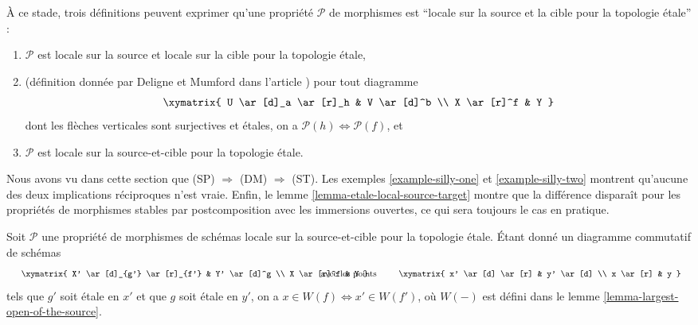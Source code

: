 \begin{remark}
\label{remark-compare-definitions}
À ce stade, trois définitions peuvent exprimer qu'une propriété
$\mathcal{P}$ de morphismes est ``locale sur la source et la cible pour la
topologie \'etale'' :
\begin{enumerate}
\item[(ST)] $\mathcal{P}$ est locale sur la source et locale sur la cible pour
la topologie \'etale,
\item[(DM)] (définition donnée par Deligne et Mumford dans l'article
\cite[p.~100]{DM}) pour tout diagramme
$$
\xymatrix{
U \ar[d]_a \ar[r]_h & V \ar[d]^b \\
X \ar[r]^f & Y
}
$$
dont les flèches verticales sont surjectives et étales, on a
$\mathcal{P}(h) \Leftrightarrow \mathcal{P}(f)$, et
\item[(SP)] $\mathcal{P}$ est locale sur la source-et-cible pour la
topologie \'etale.
\end{enumerate}
Nous avons vu dans cette section que (SP) $\Rightarrow$ (DM) $\Rightarrow$
(ST). Les exemples \ref{example-silly-one} et \ref{example-silly-two} montrent
qu'aucune des deux implications réciproques n'est vraie. Enfin, le
lemme \ref{lemma-etale-local-source-target} montre que la différence disparaît
pour les propriétés de morphismes stables par postcomposition avec les
immersions ouvertes, ce qui sera toujours le cas en pratique.
\end{remark}

\begin{lemma}
\label{lemma-etale-etale-local-source-target}
Soit $\mathcal{P}$ une propriété de morphismes de schémas locale sur la source-et-cible pour la topologie \'etale. Étant donné un diagramme commutatif
de schémas
$$
\vcenter{
\xymatrix{
X' \ar[d]_{g'} \ar[r]_{f'} & Y' \ar[d]^g \\
X \ar[r]^f & Y
}
}
\quad\text{avec les points}\quad
\vcenter{
\xymatrix{
x' \ar[d] \ar[r] & y' \ar[d] \\
x \ar[r] & y
}
}
$$
tels que $g'$ soit \'etale en $x'$ et que $g$ soit \'etale en $y'$, on a
$x \in W(f) \Leftrightarrow x' \in W(f')$, où $W(-)$ est défini dans le
lemme \ref{lemma-largest-open-of-the-source}.
\end{lemma}

